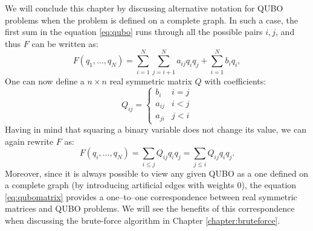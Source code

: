 We will conclude this chapter by discussing alternative notation for QUBO
problems when the problem is defined on a complete graph. In such a case, the
first sum in the equation \eqref{eq:qubo} runs through all the possible pairs
${i, j}$, and thus $F$ can be written as:
\begin{equation}
  \label{eq:qubocomplete}
  F(q_1, \ldots, q_N) =  \sum_{i=1}^N \sum_{j=i+1}^N a_{ij} q_i q_j + \sum_{i=1}^N b_iq_i,
\end{equation}
One can now define a $n \times n$ real symmetric matrix $Q$ with coefficients:
\begin{equation}
  Q_{ij} = \begin{cases}
    b_{i}  & i = j \\
    a_{ij} & i < j \\
    a_{ji} & j < i
  \end{cases}
\end{equation}
Having in mind that squaring a binary variable does not change its value, we
can again rewrite $F$ as:
\begin{equation}
  \label{eq:qubomatrix}
  F(q_{i}, \ldots, q_{N}) = \sum_{i \le j} Q_{ij} q_{i}q_{j} = \sum_{j \le i} Q_{ij} q_{i}q_{j}.
\end{equation}
Moreover, since it is always possible to view any given QUBO as a one defined
on a complete graph (by introducing artificial edges with weights 0), the
equation \eqref{eq:qubomatrix} provides a one--to--one correspondence between
real symmetric matrices and QUBO problems. We will see the benefits of
this correspondence when discussing the brute-force algorithm in Chapter \ref{chapter:bruteforce}.

